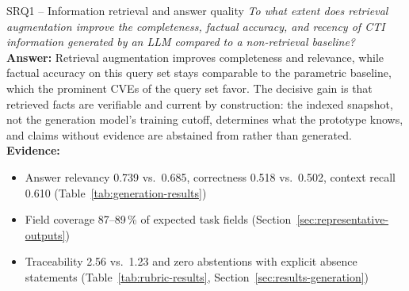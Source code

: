 \newpage
\enlargethispage{3\baselineskip}
\begin{rqbox}{SRQ1 -- Information retrieval and answer quality}
    \emph{To what extent does retrieval augmentation improve the
    completeness, factual accuracy, and recency of CTI information
    generated by an LLM compared to a non-retrieval baseline?}\\[4pt]
    \textbf{Answer:} Retrieval augmentation improves completeness and
    relevance, while factual accuracy on this query set stays comparable
    to the parametric baseline, which the prominent CVEs of the query
    set favor. The decisive gain is that retrieved facts are verifiable
    and current by construction: the indexed snapshot, not the
    generation model's training cutoff, determines what the prototype
    knows, and claims without evidence are abstained from rather than
    generated.\\[4pt]
    \textbf{Evidence:}
    \begin{itemize}
        \item Answer relevancy 0.739 vs.\ 0.685, correctness 0.518 vs.\
              0.502, context recall 0.610
              (Table~\ref{tab:generation-results})
        \item Field coverage 87--89\,\% of expected task fields
              (Section~\ref{sec:representative-outputs})
        \item Traceability 2.56 vs.\ 1.23 and zero abstentions with
              explicit absence statements
              (Table~\ref{tab:rubric-results},
              Section~\ref{sec:results-generation})
    \end{itemize}
\end{rqbox}

